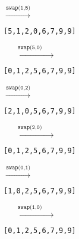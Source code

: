 \documentclass[a4paper,graphics,11pt]{article}
\begin{document}
\newpage

$\xrightarrow{\texttt{swap(1,5)}}$
\begin{minipage}{0.3\textwidth}
    \texttt{[5,1,2,0,6,7,9,9]}\\
\end{minipage}
$\xrightarrow{\qquad\texttt{swap(5,0)}\qquad}$
\begin{minipage}{0.3\textwidth}
    \texttt{[0,1,2,5,6,7,9,9]}\\
\end{minipage}

$\xrightarrow{\texttt{swap(0,2)}}$
\begin{minipage}{0.3\textwidth}
    \texttt{[2,1,0,5,6,7,9,9]}\\
\end{minipage}
$\xrightarrow{\qquad\texttt{swap(2,0)}\qquad}$
\begin{minipage}{0.3\textwidth}
    \texttt{[0,1,2,5,6,7,9,9]}\\
    \begin{center}
    \end{center}
\end{minipage}

$\xrightarrow{\texttt{swap(0,1)}}$
\begin{minipage}{0.3\textwidth}
    \texttt{[1,0,2,5,6,7,9,9]}\\
    \begin{center}
    \end{center}
\end{minipage}
$\xrightarrow{\qquad\texttt{swap(1,0)}\qquad}$
\begin{minipage}{0.3\textwidth}
    \texttt{[0,1,2,5,6,7,9,9]}\\
    \begin{center}
    \end{center}
\end{minipage}
\end{document}
